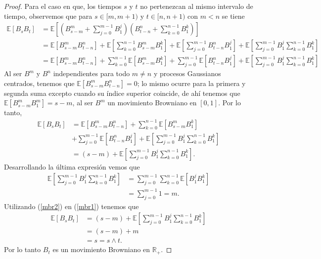 \begin{proof}
Para el caso en que, los tiempos $s$ y $t$ no pertenezcan al mismo intervalo de tiempo, observemos que para $s \in [m, m+1)$ y $t \in [n, n+1)$ con $m < n$ se tiene
\begin{align*}
\mathbb{E}[B_s B_t] & = \mathbb{E} \left[ \left( B_{s-m}^m + \sum_{j=0}^{m-1} B_1^j \right) \left( B_{t-n}^n + \sum_{k=0}^{n-1} B_1^k \right) \right] \\
& = \mathbb{E}[B_{s-m}^m B_{t-n}^n] + \mathbb{E} \left[ \sum_{k=0}^{n-1} B_{s-m}^m B_1^k \right] + \mathbb{E} \left[ \sum_{j=0}^{m-1} B_{t-n}^n B_1^j \right] + \mathbb{E} \left[ \sum_{j=0}^{m-1} B_1^j \sum_{k=0}^{n-1} B_1^k \right] \\
& = \mathbb{E}[B_{s-m}^m B_{t-n}^n] + \sum_{k=0}^{n-1} \mathbb{E} \left[ B_{s-m}^m B_1^k \right] + \sum_{j=0}^{m-1} \mathbb{E} \left[ B_{t-n}^n B_1^j \right] + \mathbb{E} \left[ \sum_{j=0}^{m-1} B_1^j \sum_{k=0}^{n-1} B_1^k \right]
\end{align*}
Al ser $B^m$ y $B^n$ independientes para todo $m \neq n$ y procesos Gaussianos centrados, tenemos que $\mathbb{E}[B_{s-m}^m B_{t-n}^n] = 0$; lo mismo ocurre para la primera y segunda suma excepto cuando su índice superior coincide, de ahí tenemos que $\mathbb{E}[B^m_{s-m} B^m_1] = s-m$, al ser $B^m$ un movimiento Browniano en $[0, 1]$. Por lo tanto,
\begin{align}
\mathbb{E}[B_s B_t] & = \mathbb{E}[B_{s-m}^m B_{t-n}^n] + \sum_{k=0}^{n-1} \mathbb{E} \left[ B_{s-m}^m B_1^k \right] \nonumber \\
& + \sum_{j=0}^{m-1} \mathbb{E} \left[ B_{t-n}^n B_1^j \right] + \mathbb{E} \left[ \sum_{j=0}^{m-1} B_1^j \sum_{k=0}^{n-1} B_1^k \right] \nonumber \\
& = (s - m) + \mathbb{E} \left[ \sum_{j=0}^{m-1} B_1^j \sum_{k=0}^{n-1} B_1^k \right] \label{mbr1}.
\end{align}
Desarrollando la última expresión vemos que
\begin{align}
	\mathbb{E} \left[ \sum_{j=0}^{m-1} B_1^j \sum_{k=0}^{n-1} B_1^k \right]  & = \sum_{j=0}^{m-1} \sum_{k=0}^{n-1} \mathbb{E} \left[ B_1^j  B_1^k \right] \nonumber \\
    & = \sum_{j=0}^{m-1} 1 = m. \label{mbr2}
\end{align}
Utilizando (\ref{mbr2}) en (\ref{mbr1}) tenemos que
\begin{align*}
\mathbb{E}[B_s B_t] & = (s - m) + \mathbb{E} \left[ \sum_{j=0}^{m-1} B_1^j \sum_{k=0}^{n-1} B_1^k \right] \\
& = (s - m) + m  \\
& = s = s \wedge t.
\end{align*}
Por lo tanto $B_t$ es un movimiento Browniano en $\mathbb{R}_{+}$.
\end{proof}

